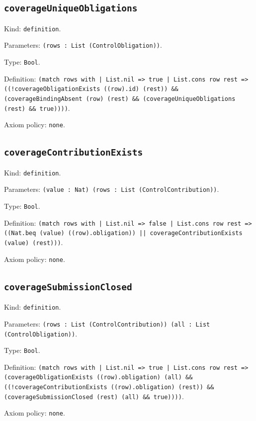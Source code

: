 \documentclass[11pt]{article}
\begin{document}
\subsection*{\texttt{coverageUniqueObligations}}
\noindent Kind: \texttt{definition}.\par
\noindent Parameters: \texttt{(rows : List (ControlObligation))}.\par
\noindent Type: \texttt{Bool}.\par
\noindent Definition: \texttt{(match rows with | List.nil => true | List.cons row rest => ((!coverageObligationExists ((row).id) (rest)) \&\& (coverageBindingAbsent (row) (rest) \&\& (coverageUniqueObligations (rest) \&\& true))))}.\par
\noindent Axiom policy: \texttt{none}.\par
\subsection*{\texttt{coverageContributionExists}}
\noindent Kind: \texttt{definition}.\par
\noindent Parameters: \texttt{(value : Nat) (rows : List (ControlContribution))}.\par
\noindent Type: \texttt{Bool}.\par
\noindent Definition: \texttt{(match rows with | List.nil => false | List.cons row rest => ((Nat.beq (value) ((row).obligation)) || coverageContributionExists (value) (rest)))}.\par
\noindent Axiom policy: \texttt{none}.\par
\subsection*{\texttt{coverageSubmissionClosed}}
\noindent Kind: \texttt{definition}.\par
\noindent Parameters: \texttt{(rows : List (ControlContribution)) (all : List (ControlObligation))}.\par
\noindent Type: \texttt{Bool}.\par
\noindent Definition: \texttt{(match rows with | List.nil => true | List.cons row rest => (coverageObligationExists ((row).obligation) (all) \&\& ((!coverageContributionExists ((row).obligation) (rest)) \&\& (coverageSubmissionClosed (rest) (all) \&\& true))))}.\par
\noindent Axiom policy: \texttt{none}.\par
\end{document}
